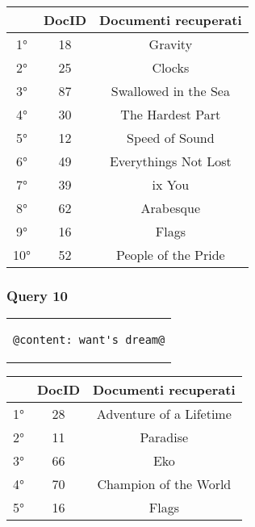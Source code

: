 \documentclass{article}
\begin{document}
\begin{table}[h!]
\centering
    \begin{tabular}{|c|c|c|}
    \hline
    & DocID & Documenti recuperati\\
    \hline
    1° & 18 & Gravity\\
    \hline
    2° & 25 & Clocks\\
    \hline
    3° & 87 & Swallowed in the Sea\\
    \hline
    4° & 30 & The Hardest Part\\
    \hline
    5° & 12 & Speed of Sound\\
    \hline
    6° & 49 & Everythings Not Lost\\
    \hline
    7° & 39 & ix You\\
    \hline
    8° & 62 & Arabesque\\
    \hline
    9° & 16 & Flags\\
    \hline
    10° & 52 & People of the Pride\\
    \hline
\end{tabular}
\end{table}

\subsubsection{Query 10}
\begin{center}
\begin{tabular}{c}
\begin{lstlisting}[style=prompt]
    @content: want's dream@
\end{lstlisting}
\end{tabular}    
\end{center}

\begin{table}[h!]
\centering
    \begin{tabular}{|c|c|c|}
    \hline
    & DocID & Documenti recuperati\\
    \hline
    1° & 28 & Adventure of a Lifetime\\
    \hline
    2° & 11 & Paradise\\
    \hline
    3° & 66 & Eko\\
    \hline
    4° & 70 & Champion of the World\\
    \hline
    5° & 16 & Flags\\
    \hline
\end{tabular}
\end{table}
\end{document}
